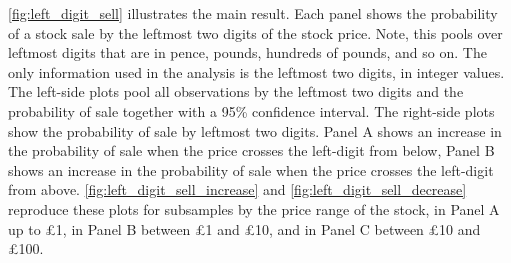 \ref{fig:left_digit_sell} illustrates the main result. Each panel shows the probability of a stock sale by the leftmost two digits of the stock price. Note, this pools over leftmost digits that are in pence, pounds, hundreds of pounds, and so on. The only information used in the analysis is the leftmost two digits, in integer values. The left-side plots pool all observations by the leftmost two digits and the probability of sale together with a 95\% confidence interval. The right-side plots show the probability of sale by leftmost two digits. Panel A shows an increase in the probability of sale when the price crosses the left-digit from below, Panel B shows an increase in the probability of sale when the price crosses the left-digit from above. \ref{fig:left_digit_sell_increase} and \ref{fig:left_digit_sell_decrease} reproduce these plots for subsamples by the price range of the stock, in Panel A up to \pounds1, in Panel B between \pounds1 and \pounds10, and in Panel C between \pounds10 and \pounds100.

